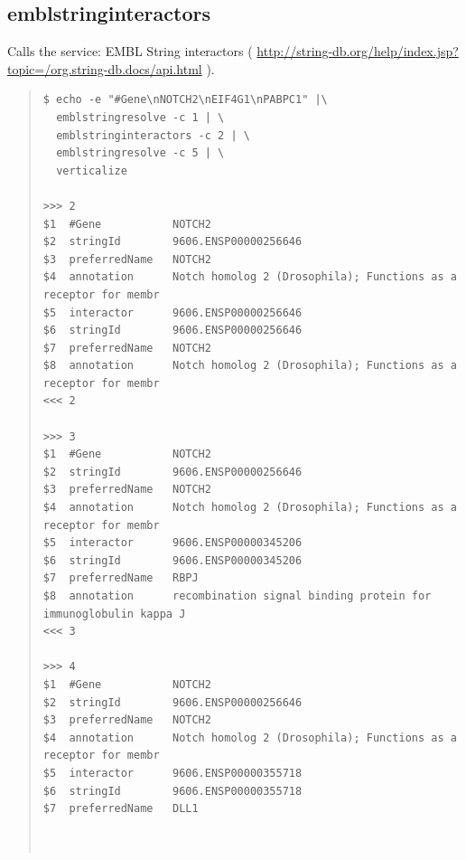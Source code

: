 \documentclass[12pt]{article}
\begin{document}
\subsection{emblstringinteractors}
Calls the service: EMBL String interactors ( \url{http://string-db.org/help/index.jsp?topic=/org.string-db.docs/api.html} ).
\begin{quote}
\begin{verbatim}
$ echo -e "#Gene\nNOTCH2\nEIF4G1\nPABPC1" |\
  emblstringresolve -c 1 | \
  emblstringinteractors -c 2 | \
  emblstringresolve -c 5 | \
  verticalize
  
>>>	2
$1	#Gene        	NOTCH2
$2	stringId     	9606.ENSP00000256646
$3	preferredName	NOTCH2
$4	annotation   	Notch homolog 2 (Drosophila); Functions as a receptor for membr
$5	interactor   	9606.ENSP00000256646
$6	stringId     	9606.ENSP00000256646
$7	preferredName	NOTCH2
$8	annotation   	Notch homolog 2 (Drosophila); Functions as a receptor for membr
<<<	2

>>>	3
$1	#Gene        	NOTCH2
$2	stringId     	9606.ENSP00000256646
$3	preferredName	NOTCH2
$4	annotation   	Notch homolog 2 (Drosophila); Functions as a receptor for membr
$5	interactor   	9606.ENSP00000345206
$6	stringId     	9606.ENSP00000345206
$7	preferredName	RBPJ
$8	annotation   	recombination signal binding protein for immunoglobulin kappa J
<<<	3

>>>	4
$1	#Gene        	NOTCH2
$2	stringId     	9606.ENSP00000256646
$3	preferredName	NOTCH2
$4	annotation   	Notch homolog 2 (Drosophila); Functions as a receptor for membr
$5	interactor   	9606.ENSP00000355718
$6	stringId     	9606.ENSP00000355718
$7	preferredName	DLL1
  
  
\end{verbatim}
\end{quote}
\end{document}
